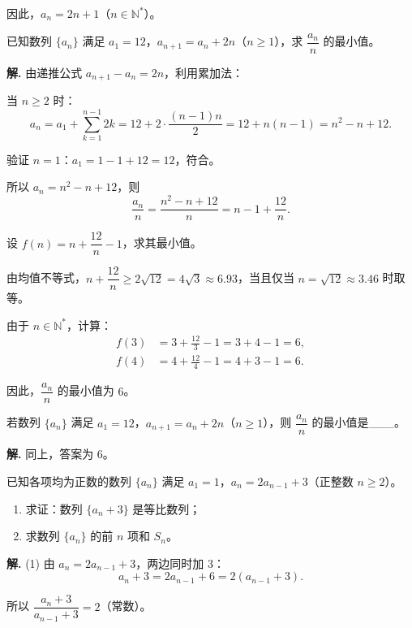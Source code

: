 \documentclass[11pt]{ctexrep}
\begin{document}
因此，$a_n = 2n + 1$（$n \in \mathbb{N}^*$）。

\begin{example}[累加法求通项]
    已知数列 $\{a_n\}$ 满足 $a_1 = 12$，$a_{n+1} = a_n + 2n$（$n \geq 1$），求 $\dfrac{a_n}{n}$ 的最小值。
\end{example}

\textbf{解.} 由递推公式 $a_{n+1} - a_n = 2n$，利用累加法：

当 $n \geq 2$ 时：
\[
    a_n = a_1 + \sum_{k=1}^{n-1} 2k = 12 + 2 \cdot \frac{(n-1)n}{2} = 12 + n(n-1) = n^2 - n + 12.
\]

验证 $n = 1$：$a_1 = 1 - 1 + 12 = 12$，符合。

所以 $a_n = n^2 - n + 12$，则
\[
    \frac{a_n}{n} = \frac{n^2 - n + 12}{n} = n - 1 + \frac{12}{n}.
\]

设 $f(n) = n + \dfrac{12}{n} - 1$，求其最小值。

由均值不等式，$n + \dfrac{12}{n} \geq 2\sqrt{12} = 4\sqrt{3} \approx 6.93$，当且仅当 $n = \sqrt{12} \approx 3.46$ 时取等。

由于 $n \in \mathbb{N}^*$，计算：
\begin{align*}
    f(3) &= 3 + \frac{12}{3} - 1 = 3 + 4 - 1 = 6, \\
    f(4) &= 4 + \frac{12}{4} - 1 = 4 + 3 - 1 = 6.
\end{align*}

因此，$\dfrac{a_n}{n}$ 的最小值为 $6$。

\begin{realexam}[2023 普陀一模改编]
    若数列 $\{a_n\}$ 满足 $a_1 = 12$，$a_{n+1} = a_n + 2n$（$n \geq 1$），则 $\dfrac{a_n}{n}$ 的最小值是\_\_\_。
\end{realexam}

\textbf{解.} 同上，答案为 $6$。

\begin{example}[构造等比数列求通项]
    已知各项均为正数的数列 $\{a_n\}$ 满足 $a_1 = 1$，$a_n = 2a_{n-1} + 3$（正整数 $n \geq 2$）。
    \begin{enumerate}
        \item 求证：数列 $\{a_n + 3\}$ 是等比数列；
        \item 求数列 $\{a_n\}$ 的前 $n$ 项和 $S_n$。
    \end{enumerate}
\end{example}

\textbf{解.} (1) 由 $a_n = 2a_{n-1} + 3$，两边同时加 $3$：
\[
    a_n + 3 = 2a_{n-1} + 6 = 2(a_{n-1} + 3).
\]

所以 $\dfrac{a_n + 3}{a_{n-1} + 3} = 2$（常数）。
\end{document}
